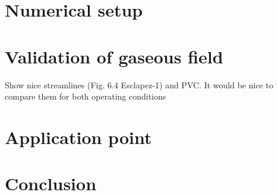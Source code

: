 \section{Numerical setup}

\section{Validation of gaseous field}

Show nice streamlines (Fig. 6.4 Esclapez-1) and PVC. It would be nice to compare them for both operating conditions

\section{Application point}

\section{Conclusion}

%
%
%
%
%
